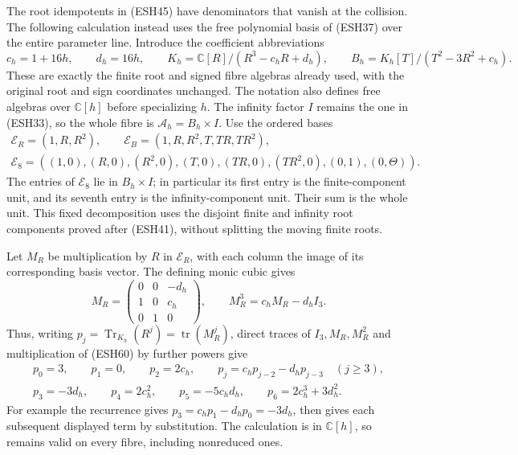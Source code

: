 \documentclass[
  10pt,
  a4paper,
]{article}
\begin{document}
The root idempotents in (ESH45) have denominators that vanish at the
collision. The following calculation instead uses the free polynomial
basis of (ESH37) over the entire parameter line. Introduce the
coefficient abbreviations \[
c_h=1+16h,\qquad d_h=16h,\qquad
K_h=\mathbb C[R]/(R^3-c_hR+d_h),\qquad
B_h=K_h[T]/(T^2-3R^2+c_h).
\tag{ESH58}
\] These are exactly the finite root and signed fibre algebras already
used, with the original root and sign coordinates unchanged. The
notation also defines free algebras over \(\mathbb C[h]\) before
specializing \(h\). The infinity factor \(I\) remains the one in
(ESH33), so the whole fibre is \(\mathcal A_h=B_h\times I\). Use the
ordered bases \[
\begin{gathered}
\mathcal E_R=(1,R,R^2),\qquad
\mathcal E_B=(1,R,R^2,T,TR,TR^2),\\
\mathcal E_8=((1,0),(R,0),(R^2,0),(T,0),(TR,0),(TR^2,0),(0,1),(0,\Theta)).
\end{gathered}
\tag{ESH59}
\] The entries of \(\mathcal E_8\) lie in \(B_h\times I\); in particular
its first entry is the finite-component unit, and its seventh entry is
the infinity-component unit. Their sum is the whole unit. This fixed
decomposition uses the disjoint finite and infinity root components
proved after (ESH41), without splitting the moving finite roots.

Let \(M_R\) be multiplication by \(R\) in \(\mathcal E_R\), with each
column the image of its corresponding basis vector. The defining monic
cubic gives \[
M_R=\begin{pmatrix}0&0&-d_h\\1&0&c_h\\0&1&0\end{pmatrix},
\qquad M_R^3=c_hM_R-d_hI_3.
\tag{ESH60}
\] Thus, writing
\(p_j=\operatorname{Tr}_{K_h}(R^j)=\operatorname{tr}(M_R^j)\), direct
traces of \(I_3,M_R,M_R^2\) and multiplication of (ESH60) by further
powers give \[
\begin{gathered}
p_0=3,\qquad p_1=0,\qquad p_2=2c_h,\qquad
p_j=c_hp_{j-2}-d_hp_{j-3}\quad(j\ge3),\\
p_3=-3d_h,\qquad p_4=2c_h^2,\qquad
p_5=-5c_hd_h,\qquad p_6=2c_h^3+3d_h^2.
\end{gathered}
\tag{ESH61}
\] For example the recurrence gives \(p_3=c_hp_1-d_hp_0=-3d_h\), then
gives each subsequent displayed term by substitution. The calculation is
in \(\mathbb C[h]\), so remains valid on every fibre, including
nonreduced ones.
\end{document}
